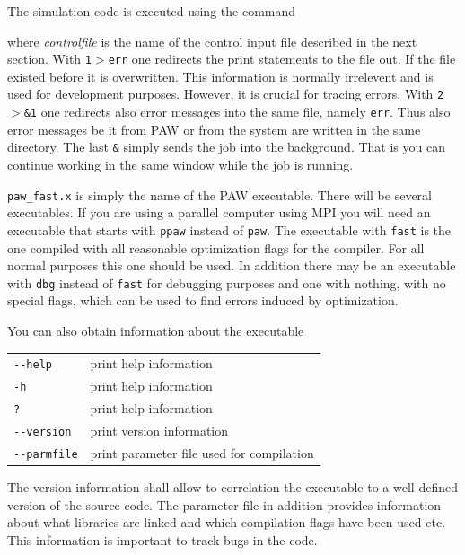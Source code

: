 \documentclass[final,12pt]{article}
\begin{document}
The simulation code is executed using the command

\bigskip{}\bigskip

\noindent where {\it controlfile} is the name of the control input
file described in the next section.  With {\tt 1$>$err} one redirects
the print statements to the file out. If the file existed before it is
overwritten. This information is normally irrelevent and is used for
development purposes. However, it is crucial for tracing errors.  With
{\tt 2$>$\&1} one redirects also error messages into the same file,
namely {\tt err}. Thus also error messages be it from PAW or from the
system are written in the same directory. The last {\tt \&} simply
sends the job into the background. That is you can continue working in
the same window while the job is running.

{\tt paw\_fast.x} is simply the name of the PAW executable. There will
be several executables. If you are using a parallel computer using MPI
you will need an executable that starts with {\tt ppaw} instead of
{\tt paw}. The executable with {\tt fast} is the one compiled with all
reasonable optimization flags for the compiler. For all normal
purposes this one should be used. In addition there may be an
executable with {\tt dbg} instead of {\tt fast} for debugging purposes
and one with nothing, with no special flags, which can be used to find
errors induced by optimization.

You can also obtain information about the executable
\begin{center}
\begin{tabular}{ll}
\verb+--help+ & print help information \\
\verb+-h+ & print help information \\
\verb+?+ & print help information \\
\verb+--version+ & print version information\\
\verb+--parmfile+ & print parameter file used for compilation\\
\end{tabular}
\end{center}
The version information shall allow to correlation the executable to a
well-defined version of the source code. The parameter file in
addition provides information about what libraries are linked and
which compilation flags have been used etc. This information is
important to track bugs in the code.
\end{document}
